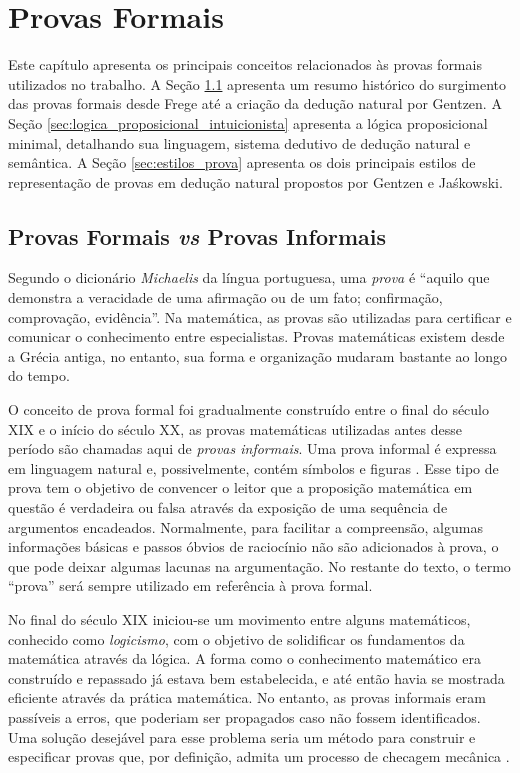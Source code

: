 
\chapter{Provas Formais}
\label{cap:prov_form}

Este capítulo apresenta os principais conceitos relacionados às provas formais utilizados no trabalho. A Seção \ref{sec:provas_formais_informais} apresenta um resumo histórico do surgimento das provas formais desde Frege até a criação da dedução natural por Gentzen. A Seção \ref{sec:logica_proposicional_intuicionista} apresenta a lógica proposicional minimal, detalhando sua linguagem, sistema dedutivo de dedução natural e semântica. A Seção \ref{sec:estilos_prova} apresenta os dois principais estilos de representação de provas em dedução natural propostos por Gentzen e Ja{\'s}kowski.

\section{Provas Formais \textit{vs} Provas Informais}
\label{sec:provas_formais_informais}

Segundo o dicionário \textit{Michaelis} da língua portuguesa, uma \textit{prova} é ``aquilo que demonstra a veracidade de uma afirmação ou de um fato; confirmação, comprovação, evidência''. Na matemática, as provas são utilizadas para certificar e comunicar o conhecimento entre especialistas. Provas matemáticas existem desde a Grécia antiga, no entanto, sua forma e organização mudaram bastante ao longo do tempo.

O conceito de prova formal foi gradualmente construído entre o final do século XIX e o início do século XX, as provas matemáticas utilizadas antes desse período são chamadas aqui de \textit{provas informais}. Uma prova informal é expressa em linguagem natural e, possivelmente, contém símbolos e figuras \cite{HandBookPT}. Esse tipo de prova tem o objetivo de convencer o leitor que a proposição matemática em questão é verdadeira ou falsa através da exposição de uma sequência de argumentos encadeados. Normalmente, para facilitar a compreensão, algumas informações básicas e passos óbvios de raciocínio não são adicionados à prova, o que pode deixar algumas lacunas na argumentação. No restante do texto, o termo ``prova'' será sempre utilizado em referência à prova formal.

No final do século XIX iniciou-se um movimento entre alguns matemáticos, conhecido como \textit{logicismo}, com o objetivo de solidificar os fundamentos da matemática através da lógica. A forma como o conhecimento matemático era construído e repassado já estava bem estabelecida, e até então havia se mostrada eficiente através da prática matemática. No entanto, as provas informais eram passíveis a erros, que poderiam ser propagados caso não fossem identificados. Uma solução desejável para esse problema seria um método para construir e especificar provas que, por definição, admita um processo de checagem mecânica \cite{marfori2010}.

